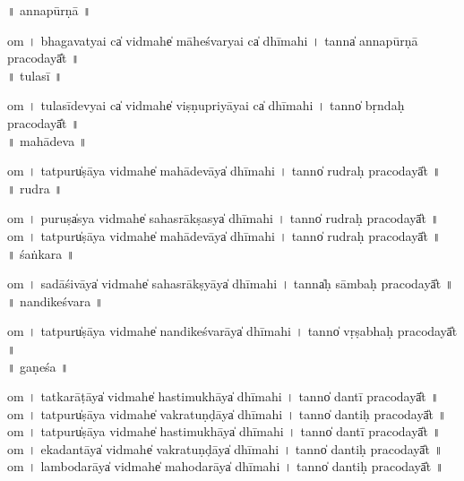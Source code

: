 \documentclass[parskip, DIV=14]{scrartcl}
\begin{document}
\vspace{0.201cm} ॥   annapūrṇā  ॥ \par
  om  । bha॒ga॒va॒tyai ca̍  vi॒dmahe̍ māheśva॒ryai ca̍ dhīmahi  ।  tanna̍ annapūrṇā praco॒dayā̎t ॥ \\

\vspace{0.201cm} ॥   tulasī  ॥ \par
  om  । tu॒la॒sī॒de॒vyai ca̍ vi॒dmahe̍ viṣṇupriyā॒yai ca̍ dhīmahi  ।  tanno̍ bṛndaḥ praco॒dayā̎t ॥ \\

\vspace{0.201cm} ॥   mahādeva ॥ \par
  om  । tatpuru̍ṣāya vi॒dmahe̍ mahāde॒vāya̍ dhīmahi  ।  tanno̍ rudraḥ praco॒dayā̎t ॥ \\

\vspace{0.201cm} ॥   rudra  ॥ \par
  om  । puruṣa̍sya vi॒dmahe̍ sahasrā॒kṣasya̍ dhīmahi  ।  tanno̍ rudraḥ praco॒dayā̎t ॥ \\
  om  । tatpuru̍ṣāya vi॒dmahe̍ mahāde॒vāya̍ dhīmahi  ।  tanno̍ rudraḥ praco॒dayā̎t ॥ \\

\vspace{0.201cm} ॥   śaṅkara  ॥ \par
  om  । sa॒dā॒śi॒vāya̍ vi॒dmahe̍ sahasrā॒kṣyāya̍ dhīmahi  ।  tanna̍ḥ sāmbaḥ praco॒dayā̎t ॥ \\

\vspace{0.201cm} ॥   nandikeśvara  ॥ \par
  om  । tatpuru̍ṣāya vi॒dmahe̍ nandikeśva॒rāya̍ dhīmahi  ।  tanno̍ vṛṣabhaḥ praco॒dayā̎t ॥ \\

\vspace{0.201cm} ॥   gaṇeśa  ॥ \par
  om  । ta॒tka॒rā॒ṭāya̍ vi॒dmahe̍ hastimu॒khāya̍ dhīmahi  ।  tanno̍ dantī praco॒dayā̎t ॥ \\
  om  । tatpuru̍ṣāya vi॒dmahe̍ vakratu॒ṇḍāya̍ dhīmahi  ।  tanno̍ dantiḥ praco॒dayā̎t ॥ \\
  om  । tatpuru̍ṣāya vi॒dmahe̍ hastimu॒khāya̍ dhīmahi  ।  tanno̍ dantī praco॒dayā̎t ॥ \\
  om  । e॒ka॒da॒ntāya̍ vi॒dmahe̍ vakratu॒ṇḍāya̍ dhīmahi  ।  tanno̍ dantiḥ praco॒dayā̎t ॥ \\
  om  । la॒mbo॒da॒rāya̍ vi॒dmahe̍ mahoda॒rāya̍ dhīmahi  ।  tanno̍ dantiḥ praco॒dayā̎t ॥ \\
\end{document}

